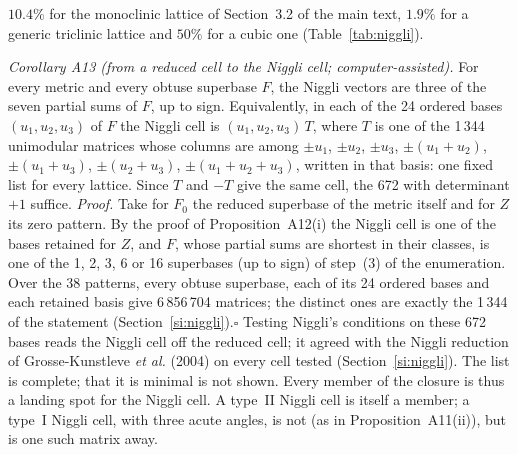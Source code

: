 \documentclass[preprint,pdf]{iucr}          %
\begin{document}
$10.4\%$ for the monoclinic lattice of Section~3.2 of the main text, $1.9\%$ for a generic triclinic lattice and $50\%$ for a cubic one (Table~\ref{tab:niggli}).

\emph{Corollary A13 (from a reduced cell to the Niggli cell; computer-assisted).} For every metric and every obtuse superbase $F$, the Niggli vectors are three of the seven partial sums of $F$, up to sign. Equivalently, in each of the 24 ordered bases $(u_1,u_2,u_3)$ of $F$ the Niggli cell is $(u_1,u_2,u_3)\,T$, where $T$ is one of the 1\,344 unimodular matrices whose columns are among $\pm u_1$, $\pm u_2$, $\pm u_3$, $\pm(u_1+u_2)$, $\pm(u_1+u_3)$, $\pm(u_2+u_3)$, $\pm(u_1+u_2+u_3)$, written in that basis: one fixed list for every lattice. Since $T$ and $-T$ give the same cell, the 672 with determinant $+1$ suffice. \emph{Proof.} Take for $F_0$ the reduced superbase of the metric itself and for $Z$ its zero pattern. By the proof of Proposition~A12(i) the Niggli cell is one of the bases retained for $Z$, and $F$, whose partial sums are shortest in their classes, is one of the 1, 2, 3, 6 or 16 superbases (up to sign) of step~(3) of the enumeration. Over the 38 patterns, every obtuse superbase, each of its 24 ordered bases and each retained basis give 6\,856\,704 matrices; the distinct ones are exactly the 1\,344 of the statement (Section~\ref{si:niggli}).\hfill$\square$ Testing Niggli's conditions on these 672 bases reads the Niggli cell off the reduced cell; it agreed with the Niggli reduction of Grosse-Kunstleve \emph{et al.} (2004) on every cell tested (Section~\ref{si:niggli}). The list is complete; that it is minimal is not shown. Every member of the closure is thus a landing spot for the Niggli cell. A type~II Niggli cell is itself a member; a type~I Niggli cell, with three acute angles, is not (as in Proposition~A11(ii)), but is one such matrix away.
\end{document}
